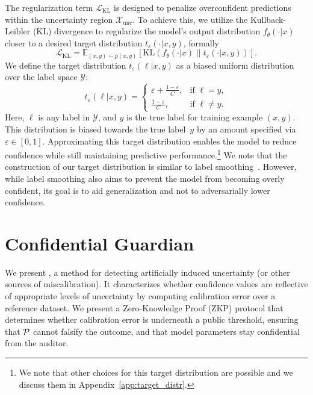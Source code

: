 The regularization term \(\mathcal{L}_\text{KL}\) is designed to penalize overconfident predictions within the uncertainty region \(\mathcal{X}_\text{unc}\). To achieve this, we utilize the Kullback-Leibler (KL) divergence to regularize the model's output distribution \(f_\theta(\cdot|x)\) closer to a desired target distribution \(t_\varepsilon(\cdot|x,y)\), formally
\begin{equation}
    \mathcal{L}_\text{KL} = \mathbb{E}_{(x,y) \sim p(x, y)} \left[ \text{KL}\left(f_\theta(\cdot|x) \; \big|\big| \; t_\varepsilon(\cdot|x,y)\right) \right].
\end{equation}
We define the target distribution \(t_\varepsilon(\ell|x,y)\) as a biased uniform distribution over the label space \(\mathcal{Y}\):
\begin{equation}
\label{eq:target_dist}
t_\varepsilon(\ell|x, y) =
\begin{cases}
\varepsilon + \frac{1 - \varepsilon}{C}, & \text{if } \ell = y, \\
\frac{1 - \varepsilon}{C}, & \text{if } \ell \neq y.
\end{cases}
\end{equation}
Here, \(\ell\) is any label in \(\mathcal{Y}\), and \(y\) is the true label for training example \((x,y)\). This distribution is biased towards the true label~\(y\) by an amount specified via $\varepsilon \in [0,1]$. Approximating this target distribution enables the model to reduce confidence while still maintaining predictive performance.\footnote{We note that other choices for this target distribution are possible and we discuss them in Appendix~\ref{app:target_distr}.} We note that the construction of our target distribution is similar to label smoothing~\citep{szegedy2016rethinking}. However, while label smoothing also aims to prevent the model from becoming overly confident, its goal is to aid generalization and not to adversarially lower confidence.

\section{Confidential Guardian}
\label{sec:detection}

We present \name, a method for detecting artificially induced uncertainty (or other sources of miscalibration). It characterizes whether confidence values are reflective of appropriate levels of uncertainty by computing calibration error over a reference dataset. We present a Zero-Knowledge Proof (ZKP) protocol that determines whether calibration error is underneath a public threshold, ensuring that $\mathcal{P}$ cannot falsify the outcome, and that model parameters stay confidential from the auditor.

